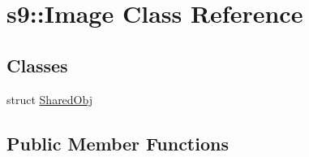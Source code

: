 \hypertarget{classs9_1_1Image}{\section{s9\-:\-:\-Image \-Class \-Reference}
\label{classs9_1_1Image}
}
\subsection*{\-Classes}
\begin{DoxyCompactItemize}
\item 
struct \hyperlink{structs9_1_1Image_1_1SharedObj}{\-Shared\-Obj}
\end{DoxyCompactItemize}
\subsection*{\-Public \-Member \-Functions}
